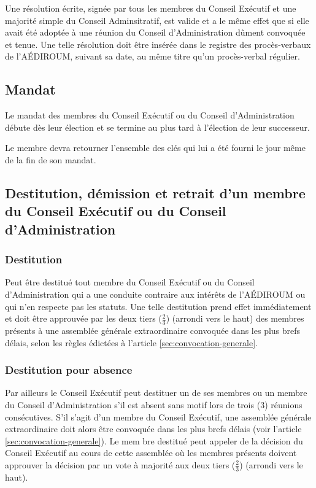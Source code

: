 \documentclass{aediroum}
\newcommand{\article}[1]{article \ref{#1}}
\begin{document}
Une résolution écrite, signée par tous les membres du Conseil Exécutif et une majorité simple du Conseil Adminsitratif, est valide et a le même effet que si elle avait été adoptée à une réunion du Conseil d'Administration dûment convoquée et tenue. Une telle résolution doit être insérée dans le registre des procès-verbaux de l'AÉDIROUM, suivant sa date, au même titre qu'un procès-verbal régulier.

\subsection{Mandat}\label{sec:mandat}
Le mandat des membres du Conseil Exécutif ou du Conseil d'Administration débute dès leur élection et se termine au plus tard à l'élection de leur successeur.

Le membre devra retourner l'ensemble des clés qui lui a été fourni le jour même de la fin de son mandat.

\subsection{Destitution, démission et retrait d'un membre du Conseil Exécutif ou du Conseil d'Administration}\label{sec:destitution-demission-retrait-exec-admin}
\subsubsection{Destitution}\label{sec:destitution}

Peut être destitué tout membre du Conseil Exécutif ou du Conseil d'Administration qui a une conduite contraire aux intérêts de l'AÉDIROUM ou qui n'en respecte pas les statuts. Une telle destitution prend effet immédiatement et doit être approuvée par les deux tiers (\( \frac{2}{3} \)) (arrondi vers le haut) des membres présents à une assemblée générale extraordinaire convoquée dans les plus brefs délais, selon les règles édictées à l'\article{sec:convocation-generale}.

\subsubsection{Destitution pour absence}\label{sec:destitution-pour-absence}

Par ailleurs le Conseil Exécutif peut destituer un de ses membres ou un membre du Conseil d'Administration s'il est absent sans motif lors de trois (3) réunions consécutives. S'il s'agit d'un membre du Conseil Exécutif, une assemblée générale extraordinaire doit alors être convoquée dans les plus brefs délais (voir l'\article{sec:convocation-generale}). Le mem
bre destitué peut appeler de la décision du Conseil Exécutif au cours de cette assemblée où les membres présents doivent approuver la décision par un vote à majorité aux deux tiers (\( \frac{2}{3} \)) (arrondi vers le haut).
\end{document}
